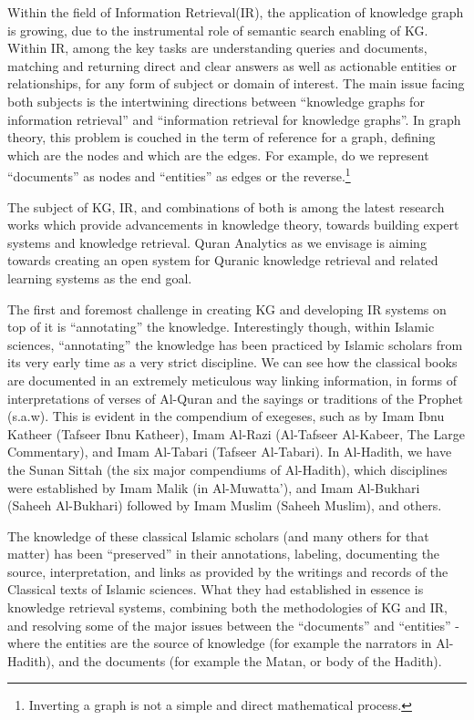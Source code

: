 \documentclass[
]{article}
\begin{document}
Within the field of Information Retrieval(IR), the application of knowledge graph is growing, due to the instrumental role of semantic search enabling of KG. Within IR, among the key tasks are understanding queries and documents, matching and returning direct and clear answers as well as actionable entities or relationships, for any form of subject or domain of interest. The main issue facing both subjects is the intertwining directions between ``knowledge graphs for information retrieval'' and ``information retrieval for knowledge graphs''\citep{reinada2020}. In graph theory, this problem is couched in the term of reference for a graph, defining which are the nodes and which are the edges. For example, do we represent ``documents'' as nodes and ``entities'' as edges or the reverse.\footnote{Inverting a graph is not a simple and direct mathematical process.}

The subject of KG, IR, and combinations of both is among the latest research works which provide advancements in knowledge theory, towards building expert systems and knowledge retrieval. Quran Analytics as we envisage is aiming towards creating an open system for Quranic knowledge retrieval and related learning systems as the end goal.

The first and foremost challenge in creating KG and developing IR systems on top of it is ``annotating'' the knowledge. Interestingly though, within Islamic sciences, ``annotating'' the knowledge has been practiced by Islamic scholars from its very early time as a very strict discipline. We can see how the classical books are documented in an extremely meticulous way linking information, in forms of interpretations of verses of Al-Quran and the sayings or traditions of the Prophet (s.a.w). This is evident in the compendium of exegeses, such as by Imam Ibnu Katheer (Tafseer Ibnu Katheer), Imam Al-Razi (Al-Tafseer Al-Kabeer, The Large Commentary), and Imam Al-Tabari (Tafseer Al-Tabari). In Al-Hadith, we have the Sunan Sittah (the six major compendiums of Al-Hadith), which disciplines were established by Imam Malik (in Al-Muwatta'), and Imam Al-Bukhari (Saheeh Al-Bukhari) followed by Imam Muslim (Saheeh Muslim), and others.

The knowledge of these classical Islamic scholars (and many others for that matter) has been ``preserved'' in their annotations, labeling, documenting the source, interpretation, and links as provided by the writings and records of the Classical texts of Islamic sciences. What they had established in essence is knowledge retrieval systems, combining both the methodologies of KG and IR, and resolving some of the major issues between the ``documents'' and ``entities'' - where the entities are the source of knowledge (for example the narrators in Al-Hadith), and the documents (for example the Matan, or body of the Hadith).
\end{document}
